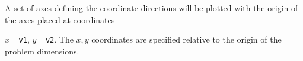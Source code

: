 \headb

A set of axes defining the coordinate directions will
be plotted with the origin of the axes placed at coordinates

$x$= {\tt v1}, $y$= {\tt v2}.  The $x, y$ coordinates are specified
relative to the origin of the problem dimensions.
\vfill
\eject
